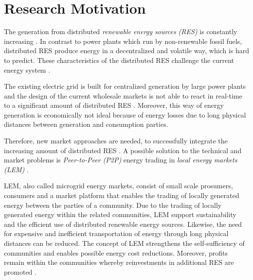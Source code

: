 \section{Research Motivation}
\label{sec:research_motivation}

The generation from distributed \textit{renewable energy sources (RES)} is constantly increasing . 
In contrast to power plants which run by non-renewable fossil fuels, distributed RES produce energy in a decentralized and volatile way, which is hard to predict. 
These characteristics of the distributed RES challenge the current energy system .

The existing electric grid is built for centralized generation by large power plants 
and the design of the current wholesale markets
is not able to react in real-time to a significant amount of distributed RES  . 
Moreover, this way of energy generation is economically not ideal because of energy losses due to long physical
distances between generation and consumption parties. 

Therefore, new market approaches are needed, to successfully integrate the increasing amount of distributed RES . 
A possible solution to the technical and market problems is \textit{Peer-to-Peer (P2P)} energy trading in \textit{local energy markets (LEM)} . 

LEM, also called microgrid energy markets, consist of small scale prosumers, consumers and a market platform that enables the trading 
of locally generated energy between the parties of a community.
Due to the trading of locally generated energy within the related communities,
LEM support sustainability and the efficient use of distributed renewable energy sources.
Likewise, the need for expensive and inefficient transportation of energy through long physical 
distances can be reduced. The concept of LEM strengthens the self-sufficiency of communities and 
enables possible energy cost reductions. Moreover, profits remain within the communities 
whereby reinvestments in additional RES are promoted . 

